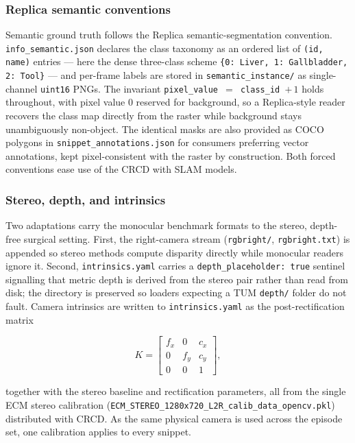 \documentclass{article}
\begin{document}
\subsubsection{Replica semantic conventions}

Semantic ground truth follows the Replica semantic-segmentation convention. \texttt{info\_semantic.json} declares the class taxonomy as an ordered list of \texttt{(id, name)} entries --- here the dense three-class scheme \texttt{\{0:\,Liver, 1:\,Gallbladder, 2:\,Tool\}} --- and per-frame labels are stored in \texttt{semantic\_instance/} as single-channel \texttt{uint16} PNGs. The invariant \texttt{pixel\_value $=$ class\_id $+\,1$} holds throughout, with pixel value 0 reserved for background, so a Replica-style reader recovers the class map directly from the raster while background stays unambiguously non-object. The identical masks are also provided as COCO polygons in \texttt{snippet\_annotations.json} for consumers preferring vector annotations, kept pixel-consistent with the raster by construction. Both forced conventions ease use of the CRCD with SLAM models.

\subsubsection{Stereo, depth, and intrinsics}

Two adaptations carry the monocular benchmark formats to the stereo, depth-free surgical setting. First, the right-camera stream (\texttt{rgbright/}, \texttt{rgbright.txt}) is appended so stereo methods compute disparity directly while monocular readers ignore it. Second, \texttt{intrinsics.yaml} carries a \texttt{depth\_placeholder: true} sentinel signalling that metric depth is derived from the stereo pair rather than read from disk; the directory is preserved so loaders expecting a TUM \texttt{depth/} folder do not fault. Camera intrinsics are written to \texttt{intrinsics.yaml} as the post-rectification matrix

\begin{equation}
    K =
    \begin{bmatrix}
        f_x & 0   & c_x \\
        0   & f_y & c_y \\
        0   & 0   & 1
    \end{bmatrix},
\end{equation}

together with the stereo baseline and rectification parameters, all from the single ECM stereo calibration (\texttt{ECM\_STEREO\_1280x720\_L2R\_calib\_data\_opencv.pkl}) distributed with CRCD. As the same physical camera is used across the episode set, one calibration applies to every snippet. 
\FloatBarrier
\end{document}
